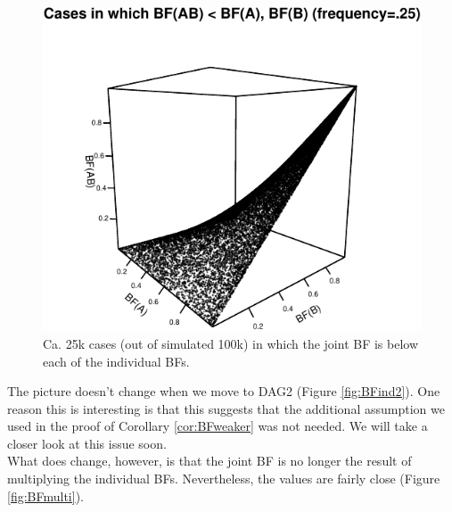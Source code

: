 \documentclass[
  10pt,
  dvipsnames,enabledeprecatedfontcommands]{scrartcl}
\begin{document}
\begin{figure}

\begin{center}\includegraphics[width=1\linewidth]{conjunction-appendix13_files/figure-latex/unnamed-chunk-11-1} \end{center}
\caption{Ca. 25k cases (out of simulated 100k) in which the joint BF is below each of the individual BFs.}
\label{fig:BFfails}
\end{figure}

The picture doesn't change when we move to \textsf{DAG2} (Figure
\ref{fig:BFind2}). One reason this is interesting is that this suggests
that the additional assumption we used in the proof of Corollary
\ref{cor:BFweaker} was not needed. We will take a closer look at this
issue soon.\\
What does change, however, is that the joint BF is no longer the result
of multiplying the individual BFs. Nevertheless, the values are fairly
close (Figure \ref{fig:BFmulti}).

\vspace{1mm}
\footnotesize

\normalsize
\end{document}

